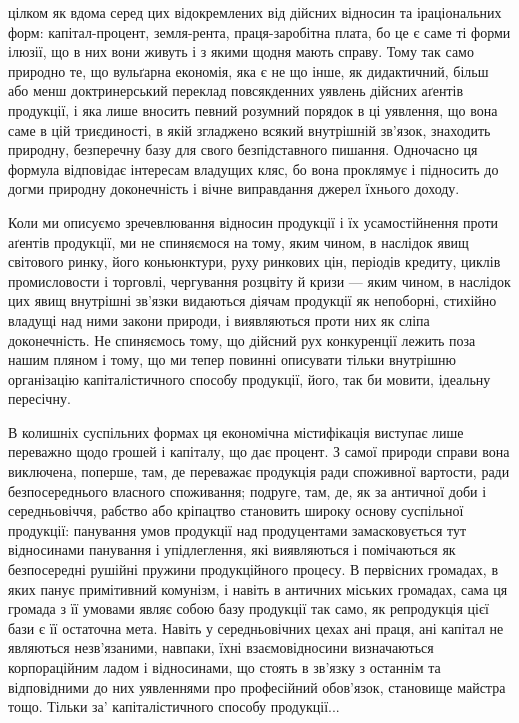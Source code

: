 цілком як вдома серед цих відокремлених від дійсних відносин та іраціональних
форм: капітал-процент, земля-рента, праця-заробітна плата, бо це є саме ті
форми ілюзії, що в них вони живуть і з якими щодня мають справу. Тому
так само природно те, що вульґарна економія, яка є не що інше, як дидактичний,
більш або менш доктринерський переклад повсякденних уявлень дійсних аґентів
продукції, і яка лише вносить певний розумний порядок в ці уявлення, що вона
саме в цій триєдиності, в якій згладжено всякий внутрішній зв’язок, знаходить
природну, безперечну базу для свого безпідставного пишання. Одночасно ця
формула відповідає інтересам владущих кляс, бо вона проклямує і підносить
до догми природну доконечність і вічне виправдання джерел їхнього доходу.

Коли ми описуємо зречевлювання відносин продукції і їх усамостійнення
проти аґентів продукції, ми не спиняємося на тому, яким чином, в наслідок
явищ світового ринку, його коньюнктури, руху ринкових цін, періодів кредиту,
циклів промисловости і торговлі, чергування розцвіту й кризи — яким чином,
в наслідок цих явищ внутрішні зв’язки видаються діячам продукції як непоборні,
стихійно владущі над ними закони природи, і виявляються проти них як сліпа
доконечність. Не спиняємось тому, що дійсний рух конкуренції лежить поза
нашим пляном і тому, що ми тепер повинні описувати тільки внутрішню
організацію капіталістичного способу продукції, його, так би мовити, ідеальну
пересічну.

В колишніх суспільних формах ця економічна містифікація виступає лише
переважно щодо грошей і капіталу, що дає процент. З самої природи справи
вона виключена, поперше, там, де переважає продукція ради споживної вартости,
ради безпосереднього власного споживання; подруге, там, де, як за античної доби
і середньовіччя, рабство або кріпацтво становить широку основу суспільної продукції:
панування умов продукції над продуцентами замасковується тут відносинами
панування і упідлеглення, які виявляються і помічаються як безпосередні
рушійні пружини продукційного процесу. В первісних громадах, в яких
панує примітивний комунізм, і навіть в античних міських громадах, сама ця
громада з її умовами являє собою базу продукції так само, як репродукція цієї
бази є її остаточна мета. Навіть у середньовічних цехах ані праця, ані капітал
не являються незв’язаними, навпаки, їхні взаємовідносини визначаються корпораційним
ладом і відносинами, що стоять в зв’язку з останнім та відповідними
до них уявленнями про професійний обов’язок, становище майстра тощо.
Тільки за' капіталістичного способу продукції...

